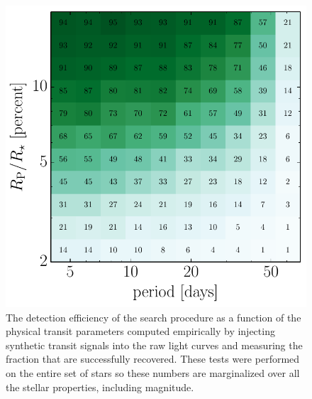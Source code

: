 \documentclass[12pt,preprint]{aastex}
\newcommand{\figlabel}[1]{\label{fig:#1}}
\begin{document}
\begin{figure}[p]
\begin{center}
\includegraphics{figures/completeness.pdf}
\end{center}
\caption{%
The detection efficiency of the search procedure as a function of the
physical transit parameters computed empirically by
injecting synthetic transit signals into the raw light curves and measuring
the fraction that are successfully recovered.
These tests were performed on the entire set of stars so these numbers are
marginalized over all the stellar properties, including magnitude.
\figlabel{completeness}}
\end{figure}
\end{document}
